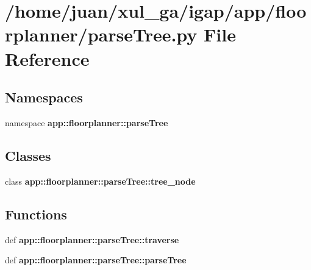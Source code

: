 \section{/home/juan/xul\_\-ga/igap/app/floorplanner/parseTree.py File Reference}
\label{parseTree_8py}
\subsection*{Namespaces}
\begin{CompactItemize}
\item 
namespace {\bf app::floorplanner::parseTree}
\end{CompactItemize}
\subsection*{Classes}
\begin{CompactItemize}
\item 
class {\bf app::floorplanner::parseTree::tree\_\-node}
\end{CompactItemize}
\subsection*{Functions}
\begin{CompactItemize}
\item 
def {\bf app::floorplanner::parseTree::traverse}
\item 
def {\bf app::floorplanner::parseTree::parseTree}
\end{CompactItemize}
